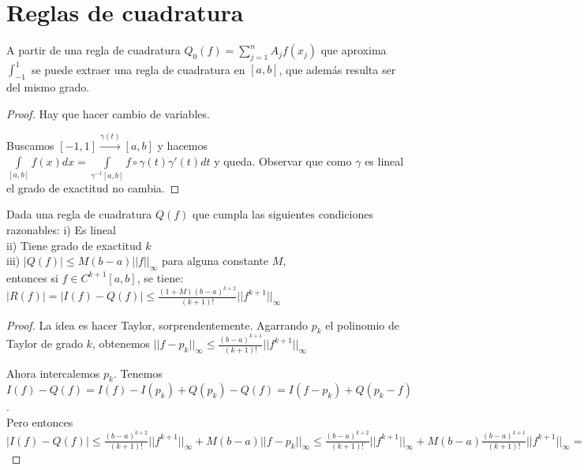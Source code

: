 \documentclass[10pt,a4paper,final]{report}
\begin{document}
\section{Reglas de cuadratura}

\begin{proposition}
A partir de una regla de cuadratura $Q_0(f) = \sum_{j=1}^n A_j f(x_j)$ que aproxima $\int_{-1}^1$ se puede extraer una regla de cuadratura en $[a,b]$, que además resulta ser del mismo grado.

\end{proposition}

\begin{proof}
	Hay que hacer cambio de variables.
	
	Buscamos $[-1,1] \overset{\gamma(t)}{\rightarrow} [a,b]$ y hacemos $\underset{[a,b]}{\int} f(x) dx = \underset{\gamma^{-1}[a,b]}{\int} f\circ \gamma(t) \gamma'(t) dt$ y queda. Observar que como $\gamma$ es lineal el grado de exactitud no cambia.
\end{proof}

\begin{theorem}
	 Dada una regla de cuadratura $Q(f)$ que cumpla las siguientes condiciones razonables:
	 i) Es lineal\\
	 ii) Tiene grado de exactitud $k$\\
	 iii) $|Q(f)| \leq M (b-a) ||f||_\infty$ para alguna constante $M$,\\
	 
	 entonces si $f\in C^{k+1}[a,b]$, se tiene:\\
	 $|R(f)|=|I(f)-Q(f)| \leq \frac{(1+M) (b-a)^{k+2}}{(k+1)!} ||f^{k+1}||_\infty$
\end{theorem}

\begin{proof}
	La idea es hacer Taylor, sorprendentemente. Agarrando $p_k$ el polinomio de Taylor de grado $k$, obtenemos $||f-p_k||_\infty \leq \frac{(b-a)^{k+1}}{(k+1)!} ||f^{k+1}||_\infty$
	
	Ahora intercalemos $p_k$. Tenemos $I(f)-Q(f) = I(f) - I(p_k) + Q(p_k) - Q(f) = I(f-p_k) + Q(p_k - f)$.\\
	
	Pero entonces $|I(f)-Q(f)|\leq \frac{(b-a)^{k+2}}{(k+1)!} ||f^{k+1}||_\infty + M(b-a) ||f-p_k||_\infty \leq \frac{(b-a)^{k+2}}{(k+1)!} ||f^{k+1}||_\infty + M(b-a)  \frac{(b-a)^{k+1}}{(k+1)!} ||f^{k+1}||_\infty = (M+1) \frac{(b-a)^{k+2}}{(k+1)!} ||f^{k+1}||_\infty$
\end{proof}
\end{document}
